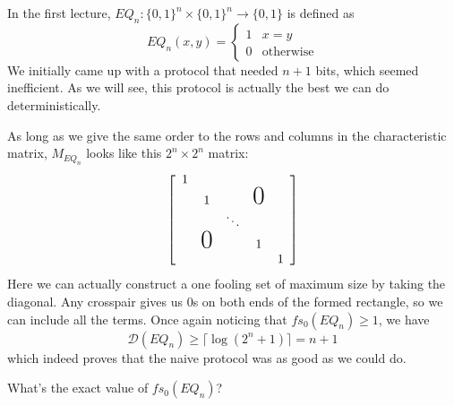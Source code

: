 \documentclass[letterpaper]{article}
\begin{document}
\begin{example}
    In the first lecture, $EQ_n: \{0, 1\}^n \times \{0, 1\}^n \to \{0, 1\}$ is defined as
    \[EQ_n(x, y)=\begin{cases}
            1 & x = y            \\
            0 & \text{otherwise}
        \end{cases}\]
    We initially came up with a protocol that needed $n+1$ bits, which seemed inefficient.
    As we will see, this protocol is actually the best we can do deterministically.

    As long as we give the same order to the rows and columns in the characteristic matrix,
    $M_{EQ_n}$ looks like this $2^n \times 2^n$ matrix:
    \[
        \left[
            \begin{array}{ccccc}
                1                                             \\
                 & 1             &        & \text{\huge0}     \\
                 &               & \ddots                     \\
                 & \text{\huge0} &        & 1                 \\
                 &               &        &               & 1
            \end{array}
            \right]
    \]
    Here we can actually construct a one fooling set of maximum size
    by taking the diagonal. Any crosspair gives us $0$s on both ends
    of the formed rectangle, so we can include all the terms.
    Once again noticing that $fs_0(EQ_n) \ge 1$, we have
    \[\mathcal{D}(EQ_n) \ge \lceil\log\left(2^n+1\right)\rceil = n+1\]
    which indeed proves that the naive protocol was as good as we could do.
\end{example}

\begin{problem}
What's the exact value of $fs_0(EQ_n)$?
\end{problem}
\end{document}
